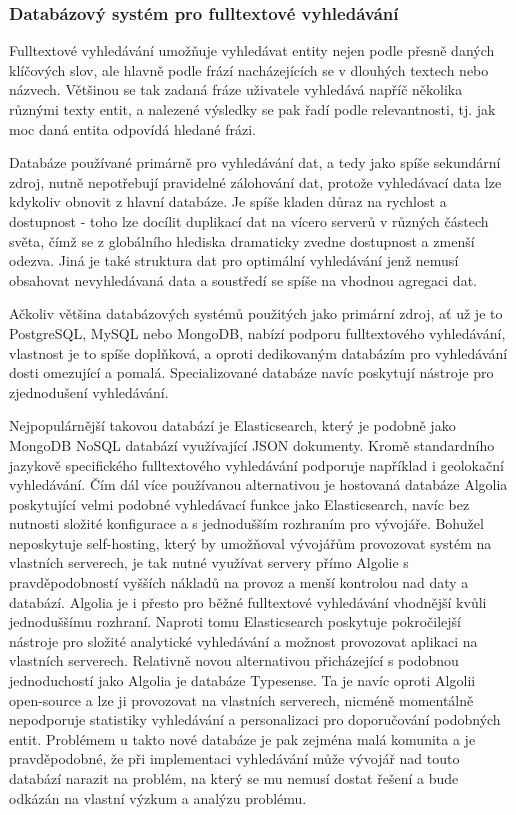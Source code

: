 		\subsubsection{Databázový systém pro fulltextové vyhledávání}

		Fulltextové vyhledávání umožňuje vyhledávat entity nejen podle přesně daných klíčových slov, ale hlavně podle
		frází nacházejících se v dlouhých textech nebo názvech.
		Většinou se tak zadaná fráze uživatele vyhledává napříč několika různými texty entit, a nalezené výsledky se pak
		řadí podle relevantnosti, tj. jak moc daná entita odpovídá hledané frázi.

		Databáze používané primárně pro vyhledávání dat, a tedy jako spíše sekundární zdroj, nutně nepotřebují pravidelné
		zálohování dat, protože vyhledávací data lze kdykoliv obnovit z hlavní databáze.
		Je spíše kladen důraz na rychlost a dostupnost - toho lze docílit duplikací dat na vícero serverů v různých částech
		světa, čímž se z globálního hlediska dramaticky zvedne dostupnost a zmenší odezva.
		Jiná je také struktura dat pro optimální vyhledávání jenž nemusí obsahovat nevyhledávaná data
		a soustředí se spíše na vhodnou agregaci dat.

		Ačkoliv většina databázových systémů použitých jako primární zdroj, ať už je to PostgreSQL, MySQL nebo MongoDB,
		nabízí podporu fulltextového vyhledávání, vlastnost je to spíše doplňková, a oproti dedikovaným databázím
		pro vyhledávání dosti omezující a pomalá.
		Specializované databáze navíc poskytují nástroje pro zjednodušení vyhledávání.

		Nejpopulárnější takovou databází je Elasticsearch, který je podobně jako MongoDB \Ac{NoSQL} databází
		využívající \Ac{JSON} dokumenty.
		Kromě standardního jazykově specifického fulltextového vyhledávání podporuje například i geolokační vyhledávání. \cite{es_documents}
		Čím dál více používanou alternativou je hostovaná databáze Algolia poskytující velmi podobné vyhledávací
		funkce jako Elasticsearch, navíc bez nutnosti složité konfigurace a s jednodušším rozhraním pro vývojáře.
		Bohužel neposkytuje self-hosting, který by umožňoval vývojářům provozovat systém na vlastních serverech, je tak
		nutné využívat servery přímo Algolie s pravděpodobností vyšších nákladů na provoz a menší kontrolou nad daty a
		databází. \cite{algolia}
		Algolia je i přesto pro běžné fulltextové vyhledávání vhodnější kvůli jednoduššímu rozhraní.
		Naproti tomu Elasticsearch poskytuje pokročilejší nástroje pro složité analytické vyhledávání a možnost
		provozovat aplikaci na vlastních serverech.\cite{es_vs_algolia}
		Relativně novou alternativou přicházející s podobnou jednoduchostí jako Algolia je databáze Typesense.
		Ta je navíc oproti Algolii open-source a lze ji provozovat na vlastních serverech, nicméně momentálně nepodporuje
		statistiky vyhledávání a personalizaci pro doporučování podobných entit.\cite{typesence}
		Problémem u takto nové databáze je pak zejména malá komunita a je pravděpodobné, že při implementaci vyhledávání
		může vývojář nad touto databází narazit na problém, na který se mu nemusí dostat řešení a bude odkázán na vlastní
		výzkum a analýzu problému.

